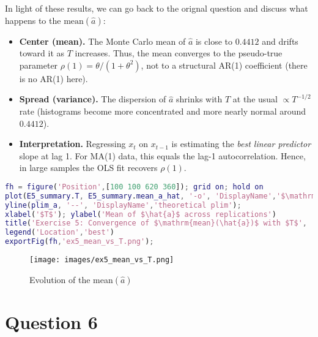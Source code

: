\documentclass[dvipsnames,11pt]{article}
\begin{document}
\begin{solution}
        In light of these results, we can go back to the orignal question and discuss what happens to the \(\mathrm{mean}(\hat a) \):

        \begin{itemize}
            \item \textbf{Center (mean).} The Monte Carlo mean of $\hat a$ is close to $0.4412$ and drifts toward it as $T$ increases. Thus, the mean converges to the pseudo-true parameter $\rho(1)=\theta/(1+\theta^2)$, not to a structural AR(1) coefficient (there is no AR(1) here).
          
            \item \textbf{Spread (variance).} The dispersion of $\hat a$ shrinks with $T$ at the usual $\propto T^{-1/2}$ rate (histograms become more concentrated and more nearly normal around $0.4412$).
          
            \item \textbf{Interpretation.} Regressing $x_t$ on $x_{t-1}$ is estimating the \emph{best linear predictor} slope at lag 1. For MA(1) data, this equals the lag-1 autocorrelation. Hence, in large samples the OLS fit recovers $\rho(1)$.
        \end{itemize}

\begin{lstlisting}[language=matlab]
% Optional: plot mean(\hat{a}) across T for a compact summary figure
fh = figure('Position',[100 100 620 360]); grid on; hold on
plot(E5_summary.T, E5_summary.mean_a_hat, '-o', 'DisplayName','$\mathrm{mean}(\hat{a})$');
yline(plim_a, '--', 'DisplayName','theoretical plim');
xlabel('$T$'); ylabel('Mean of $\hat{a}$ across replications')
title('Exercise 5: Convergence of $\mathrm{mean}(\hat{a})$ with $T$', 'Interpreter','latex')
legend('Location','best')
exportFig(fh,'ex5_mean_vs_T.png');
\end{lstlisting}

        \begin{figure}[h]
            \centering
            \texttt{[image: images/ex5\_mean\_vs\_T.png]}
            \caption{Evolution of the mean\((\hat{a})\)}
            \label{fig:placeholder}
        \end{figure}
        
    \end{solution}

\section*{Question 6}
\setcounter{section}{6}
\end{document}

